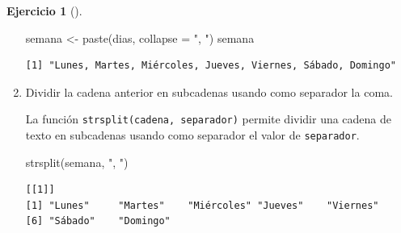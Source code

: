 \documentclass[
  spanish,
  a4paper,
]{scrreport}
\newenvironment{Shaded}{\begin{snugshade}}{\end{snugshade}}
\newcommand{\AttributeTok}[1]{\textcolor[rgb]{0.40,0.45,0.13}{#1}}
\newcommand{\FunctionTok}[1]{\textcolor[rgb]{0.28,0.35,0.67}{#1}}
\newcommand{\NormalTok}[1]{\textcolor[rgb]{0.00,0.23,0.31}{#1}}
\newcommand{\OtherTok}[1]{\textcolor[rgb]{0.00,0.23,0.31}{#1}}
\newcommand{\StringTok}[1]{\textcolor[rgb]{0.13,0.47,0.30}{#1}}
\theoremstyle{definition}
\newtheorem{exercise}{Ejercicio}[chapter]
\theoremstyle{remark}
\begin{document}
\begin{exercise}[]
\begin{enumerate}
\begin{tcolorbox}
\begin{Shaded}
\begin{Highlighting}[]
\NormalTok{semana }\OtherTok{\textless{}{-}} \FunctionTok{paste}\NormalTok{(dias, }\AttributeTok{collapse =} \StringTok{", "}\NormalTok{)}
\NormalTok{semana}
\end{Highlighting}
\end{Shaded}

\begin{verbatim}
[1] "Lunes, Martes, Miércoles, Jueves, Viernes, Sábado, Domingo"
\end{verbatim}

  \end{tcolorbox}
\item
  Dividir la cadena anterior en subcadenas usando como separador la
  coma.

  \begin{tcolorbox}[enhanced jigsaw, breakable, leftrule=.75mm, toptitle=1mm, rightrule=.15mm, opacitybacktitle=0.6, left=2mm, colframe=quarto-callout-tip-color-frame, titlerule=0mm, toprule=.15mm, opacityback=0, bottomtitle=1mm, coltitle=black, colbacktitle=quarto-callout-tip-color!10!white, title=\textcolor{quarto-callout-tip-color}{\faLightbulb}\hspace{0.5em}{Solución}, arc=.35mm, bottomrule=.15mm, colback=white]

  La función \texttt{strsplit(cadena,\ separador)} permite dividir una
  cadena de texto en subcadenas usando como separador el valor de
  \texttt{separador}.

\begin{Shaded}
\begin{Highlighting}[]
\FunctionTok{strsplit}\NormalTok{(semana, }\StringTok{", "}\NormalTok{)}
\end{Highlighting}
\end{Shaded}

\begin{verbatim}
[[1]]
[1] "Lunes"     "Martes"    "Miércoles" "Jueves"    "Viernes"  
[6] "Sábado"    "Domingo"  
\end{verbatim}

  \end{tcolorbox}
\end{enumerate}

\end{exercise}
\end{document}
